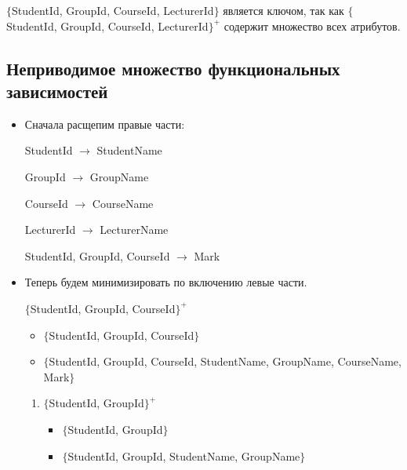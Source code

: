 \documentclass[12pt,a4paper,oneside]{article}
\begin{document}
\medskip

$\{$StudentId, GroupId, CourseId, LecturerId$\}$ является ключом, так как $\{$StudentId, GroupId, CourseId, LecturerId$\}^{+}$ содержит множество всех атрибутов.

\subsection{Неприводимое множество функциональных зависимостей}

\medskip

\begin{itemize}

\item Сначала расщепим правые части:

\medskip

StudentId $\rightarrow$ StudentName

GroupId $\rightarrow$ GroupName

CourseId $\rightarrow$ CourseName

LecturerId $\rightarrow$ LecturerName

StudentId, GroupId, CourseId $\rightarrow$ Mark

\medskip

\item Теперь будем минимизировать по включению левые части.

\medskip

$\{$StudentId, GroupId, CourseId$\}^{+}$

\begin{itemize}

\item $\{$StudentId, GroupId, CourseId$\}$

\item $\{$StudentId, GroupId, CourseId, StudentName, GroupName, CourseName, Mark$\}$

\end{itemize}

\medskip

\begin{enumerate}

\item $\{$StudentId, GroupId$\}^{+}$

\begin{itemize}

\item $\{$StudentId, GroupId$\}$

\item $\{$StudentId, GroupId, StudentName, GroupName$\}$


\end{itemize}
\end{enumerate}
\end{itemize}
\end{document}
